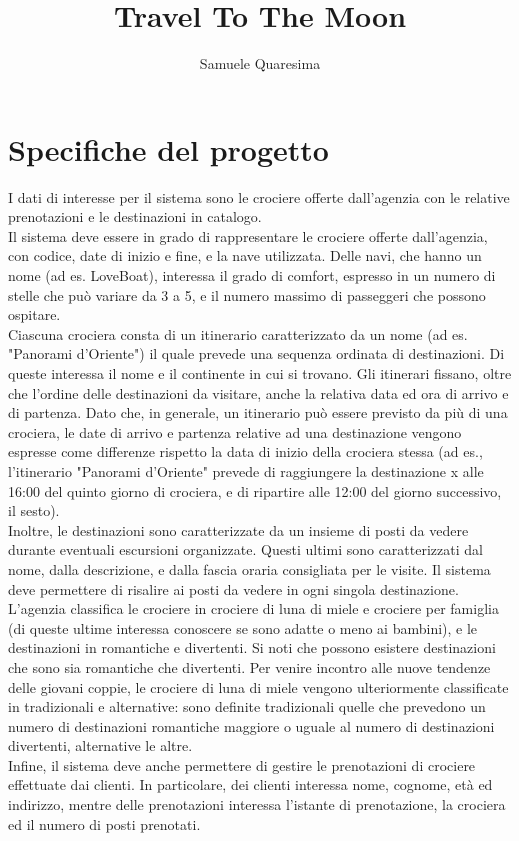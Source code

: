 \documentclass{article}
\title{Travel To The Moon}
\author{Samuele Quaresima}
\date{}
\begin{document}
\maketitle

\section{Specifiche del progetto}

I dati di interesse per il sistema sono le crociere offerte dall'agenzia con le relative prenotazioni e le destinazioni in catalogo.
\\
Il sistema deve essere in grado di rappresentare le crociere offerte dall'agenzia, con codice, date di inizio e fine, e la nave utilizzata. Delle navi, che hanno un nome (ad es. LoveBoat), interessa il grado di comfort, espresso in un numero di stelle che può variare da 3 a 5, e il numero massimo di passeggeri che possono ospitare.
\\
Ciascuna crociera consta di un itinerario caratterizzato da un nome (ad es. "Panorami d'Oriente") il quale prevede una sequenza ordinata di destinazioni. Di queste interessa il nome e il continente in cui si trovano. Gli itinerari fissano, oltre che l'ordine delle destinazioni da visitare, anche la relativa data ed ora di arrivo e di partenza. Dato che, in generale, un itinerario può essere previsto da più di una crociera, le date di arrivo e partenza relative ad una destinazione vengono espresse come differenze rispetto la data di inizio della crociera stessa (ad es., l'itinerario "Panorami d'Oriente" prevede di raggiungere la destinazione x alle 16:00 del quinto giorno di crociera, e di ripartire alle 12:00 del giorno successivo, il sesto).
\\
Inoltre, le destinazioni sono caratterizzate da un insieme di posti da vedere durante eventuali escursioni organizzate. Questi ultimi sono caratterizzati dal nome, dalla descrizione, e dalla fascia oraria consigliata per le visite. Il sistema deve permettere di risalire ai posti da vedere in ogni singola destinazione.
\\
L'agenzia classifica le crociere in crociere di luna di miele e crociere per famiglia (di queste ultime interessa conoscere se sono adatte o meno ai bambini), e le destinazioni in romantiche e divertenti. Si noti che possono esistere destinazioni che sono sia romantiche che divertenti. Per venire incontro alle nuove tendenze delle giovani coppie, le crociere di luna di miele vengono ulteriormente classificate in tradizionali e alternative: sono definite tradizionali quelle che prevedono un numero di destinazioni romantiche maggiore o uguale al numero di destinazioni divertenti, alternative le altre.
\\
Infine, il sistema deve anche permettere di gestire le prenotazioni di crociere effettuate dai clienti. In particolare, dei clienti interessa nome, cognome, età ed indirizzo, mentre delle prenotazioni interessa l'istante di prenotazione, la crociera ed il numero di posti prenotati.
\\
\end{document}
